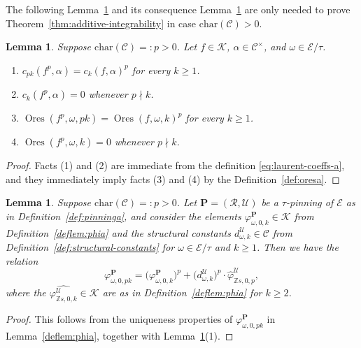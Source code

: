 \documentclass[preprint,12pt]{elsarticle}
\numberwithin{equation}{section} %
\theoremstyle{theorem}
\newtheorem{lemma}[theorem]{Lemma}
\theoremstyle{definition}
\newcommand{\Ca}{\mathcal{C}} %
\newcommand{\bk}{\mathcal{K}} %
\newcommand{\bke}{{\bk}} %
\newcommand{\ec}{\mathcal{E}} %
\newcommand{\orbita}{{\ec/\tau}} %
\newcommand{\Z}{\mathbb{Z}} %
\DeclareMathOperator{\ores}{Ores}
\begin{document}
The following Lemma~\ref{lem:p-power-basic-algebraic} and its consequence Lemma~\ref{lem:phi-p} are only needed to prove Theorem~\ref{thm:additive-integrability} in case $\mathrm{char}(\Ca)>0$.

    \begin{lemma}\label{lem:p-power-basic-algebraic} Suppose $\mathrm{char}(\Ca)=:p>0$. Let $f\in\bke$, $\alpha\in\Ca^\times$, and $\omega\in\orbita$.
    \begin{enumerate}
        \item $c_{pk}(f^p,\alpha)=c_k(f,\alpha)^p$ for every $k\geq 1$.
        \item $c_{k}(f^p,\alpha)=0$ whenever $p\nmid k$.
        \item $\ores(f^p,\omega,pk)=\ores(f,\omega,k)^p$ for every $k\geq 1$.
        \item $\ores(f^p,\omega,k)=0$ whenever $p\nmid k$.
    \end{enumerate}
    \end{lemma}

    \begin{proof}
        Facts (1) and (2) are immediate from the definition \eqref{eq:laurent-coeffs-a}, and they immediately imply facts (3) and (4) by the Definition~\ref{def:oresa}.
    \end{proof}



    \begin{lemma}\label{lem:phi-p} Suppose $\mathrm{char}(\Ca)=:p>0$. Let $\mathbf{P}=(\mathcal{R},\mathcal{U})$ be a $\tau$-pinning of $\ec$ as in Definition~\ref{def:pinninga}, and consider the elements $\varphi^\mathbf{P}_{\omega,0,k}\in\bk$ from Definition~\ref{deflem:phia} and the structural constants $d^\mathcal{U}_{\omega,k}\in\Ca$ from Definition~\ref{def:structural-constants} for $\omega\in\orbita$ and $k\geq 1$. Then we have the relation  
    \begin{equation}\label{eq:phi-p}\varphi^\mathbf{P}_{\omega,0,pk}=\bigl(\varphi^\mathbf{P}_{\omega,0,k}\bigr)^p+\bigl(d^\mathcal{U}_{\omega,k}\bigr)^p\cdot\hat{\varphi}^\mathcal{U}_{\Z s,0,p},\end{equation}
where the $\hat{\varphi^\mathcal{U}_{\Z s,0,k}}\in\bk$ are as in Definition~\ref{deflem:phia} for $k\geq 2$.\end{lemma}
\begin{proof}
   This follows from the uniqueness properties of $\varphi^\mathbf{P}_{\omega,0,pk}$ in Lemma~\ref{deflem:phia}, together with Lemma~\ref{lem:p-power-basic-algebraic}(1).
\end{proof}
\end{document}
